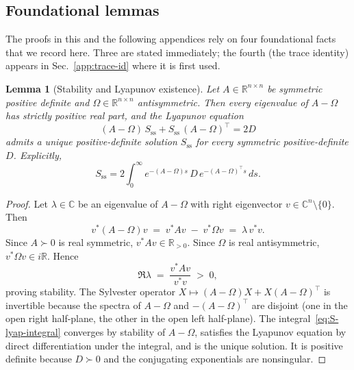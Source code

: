\documentclass[%
 reprint,
 superscriptaddress,
 nofootinbib,
 nobibnotes,
 amsmath,amssymb,
 aps,
 prl,
 floatfix,
]{revtex4-2}
\newcommand{\Sss}{S_{\mathrm{ss}}}
\newcommand{\RR}{\mathbb{R}}
\newtheorem{lemma}{Lemma}
\begin{document}
\subsection{Foundational lemmas}\label{app:prelim}

The proofs in this and the following appendices rely on four foundational facts that we record here. Three are stated immediately; the fourth (the trace identity) appears in Sec.~\ref{app:trace-id} where it is first used.

\begin{lemma}[Stability and Lyapunov existence]\label{lem:stability}
Let $A \in \RR^{n \times n}$ be symmetric positive definite and $\Omega \in \RR^{n \times n}$ antisymmetric. Then every eigenvalue of $A - \Omega$ has strictly positive real part, and the Lyapunov equation
\begin{equation}\label{eq:S-lyap-general}
(A - \Omega)\,\Sss + \Sss\,(A - \Omega)^\top = 2 D
\end{equation}
admits a unique positive-definite solution $\Sss$ for every symmetric positive-definite $D$. Explicitly,
\begin{equation}\label{eq:S-lyap-integral}
\Sss = 2 \int_0^\infty e^{-(A - \Omega) s}\, D\, e^{-(A - \Omega)^\top s}\, ds.
\end{equation}
\end{lemma}
\begin{proof}
Let $\lambda \in \mathbb{C}$ be an eigenvalue of $A - \Omega$ with right eigenvector $v \in \mathbb{C}^n \setminus \{0\}$. Then
\[
v^* (A - \Omega) v \;=\; v^* A v \;-\; v^* \Omega v \;=\; \lambda\,v^* v.
\]
Since $A \succ 0$ is real symmetric, $v^* A v \in \RR_{>0}$. Since $\Omega$ is real antisymmetric, $v^* \Omega v \in i\RR$. Hence
\[
\Re \lambda \;=\; \frac{v^* A v}{v^* v} \;>\; 0,
\]
proving stability. The Sylvester operator $X \mapsto (A - \Omega) X + X (A - \Omega)^\top$ is invertible because the spectra of $A - \Omega$ and $-(A - \Omega)^\top$ are disjoint (one in the open right half-plane, the other in the open left half-plane). The integral~\eqref{eq:S-lyap-integral} converges by stability of $A - \Omega$, satisfies the Lyapunov equation by direct differentiation under the integral, and is the unique solution. It is positive definite because $D \succ 0$ and the conjugating exponentials are nonsingular.
\end{proof}
\end{document}
